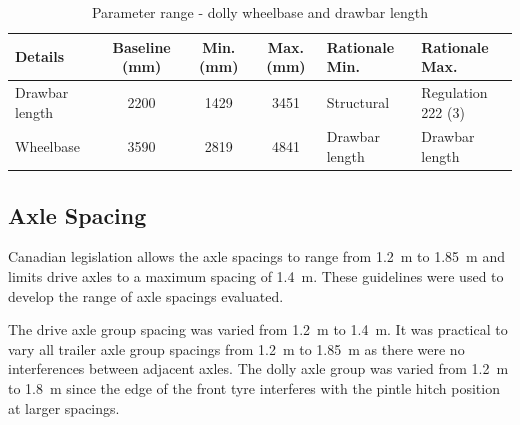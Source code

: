 \begin{table}[H]
	\centering\footnotesize
	\begin{threeparttable}

		\begin{tabulary}{\textwidth}{lcccll}
			\toprule
			\textbf{Details} & \textbf{Baseline (mm)} & \textbf{Min. (mm)} & \textbf{Max. (mm)} & \textbf{Rationale Min.} & \textbf{Rationale Max.} \\

			\midrule
			Drawbar length & 2200  & 1429  & 3451  & Structural & Regulation 222 (3) \\
			Wheelbase      & 3590  & 2819  & 4841  & Drawbar length & Drawbar length \\
			\bottomrule

		\end{tabulary}

		\caption{Parameter range - dolly wheelbase and drawbar length}
		\label{table:parameter-range-dolly-pintle-hitch-length}


	\end{threeparttable}
\end{table}

\subsection{Axle Spacing}\label{section:pr-axle-spacing}

Canadian legislation \cite{StatutesRegulations} allows the axle spacings to range from 1.2~m to 1.85~m and limits drive axles to a maximum spacing of 1.4~m. These guidelines were used to develop the range of axle spacings evaluated.

The drive axle group spacing was varied from 1.2~m to 1.4~m. It was practical to vary all trailer axle group spacings from 1.2~m to 1.85~m as there were no interferences between adjacent axles. The dolly axle group was varied from 1.2~m to 1.8~m since the edge of the front tyre interferes with the pintle hitch position at larger spacings.

